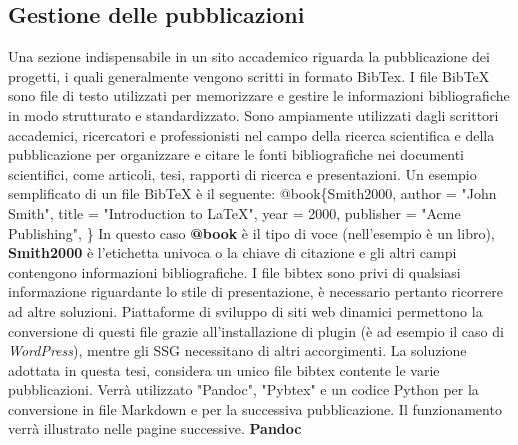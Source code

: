 \documentclass[target=bach,aauheader=]{thud}
\begin{document}
\subsection{Gestione delle pubblicazioni}
Una sezione indispensabile in un sito accademico riguarda la pubblicazione dei progetti, i quali generalmente vengono scritti in formato BibTex.
\newline
I file BibTeX sono file di testo utilizzati per memorizzare e gestire le informazioni bibliografiche in modo strutturato e standardizzato. 
Sono ampiamente utilizzati dagli scrittori accademici, ricercatori e professionisti nel campo della ricerca scientifica e della pubblicazione per organizzare e citare le fonti bibliografiche nei documenti scientifici, come articoli, tesi, rapporti di ricerca e presentazioni. 
Un esempio semplificato di un file BibTeX è il seguente:
\newline \newline
@book\{Smith2000,
\newline  author = "John Smith",
\newline  title = "Introduction to LaTeX",
\newline  year = 2000,
\newline  publisher = "Acme Publishing",
\newline \}
\newline \newline
In questo caso \textbf{@book} è il tipo di voce (nell'esempio è un libro), \textbf{Smith2000} è l'etichetta univoca o la chiave di citazione e gli altri campi contengono informazioni bibliografiche. 
\newline
I file bibtex sono privi di qualsiasi informazione riguardante lo stile di presentazione, è necessario pertanto ricorrere ad altre soluzioni. Piattaforme di sviluppo di siti web dinamici permettono la conversione di questi file grazie all'installazione di plugin (è ad esempio il caso di \textit{WordPress}), mentre gli SSG necessitano di altri accorgimenti.
\newline
La soluzione adottata in questa tesi, considera un unico file bibtex contente le varie pubblicazioni. Verrà utilizzato "Pandoc", "Pybtex" e un codice Python per la conversione in file Markdown e per la successiva pubblicazione. Il funzionamento verrà illustrato nelle pagine successive. 
\newline \newline
\textbf{{\fontsize{12}{14}\selectfont Pandoc}}
\newline \newline
\end{document}

